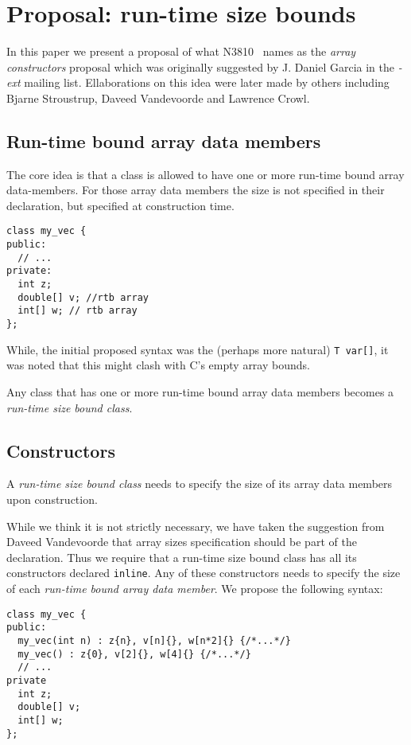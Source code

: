 \section{Proposal: run-time size bounds}

In this paper we present a proposal of what N3810~\cite{n3810} names as the
\emph{array constructors} proposal which was originally suggested by J. Daniel
Garcia in the \emph{-ext} mailing list. Ellaborations on this idea were later
made by others including Bjarne Stroustrup, Daveed Vandevoorde and Lawrence
Crowl.

\subsection{Run-time bound array data members}

The core idea is that a class is allowed to have one or more run-time
bound array data-members. For those array data members the size is not specified in their
declaration, but specified at construction time.

\begin{lstlisting}
class my_vec {
public:
  // ...
private:
  int z;
  double[] v; //rtb array
  int[] w; // rtb array
};
\end{lstlisting}

While, the initial proposed syntax was the (perhaps more natural) 
\verb+T var[]+, it was noted that this might clash with C's empty array bounds.

Any class that has one or more run-time bound array data members becomes a
\emph{run-time size bound class}.

\subsection{Constructors}

A \emph{run-time size bound class} needs to specify the size of its array data
members upon construction.

While we think it is not strictly necessary, we have taken the suggestion from
Daveed Vandevoorde that array sizes specification should be part of the
declaration. Thus we require that a run-time size bound class has all its
constructors declared \verb+inline+. Any of these constructors needs  to specify
the size of each \emph{run-time bound array data member}. We propose the
following syntax:

\begin{lstlisting}
class my_vec {
public:
  my_vec(int n) : z{n}, v[n]{}, w[n*2]{} {/*...*/}
  my_vec() : z{0}, v[2]{}, w[4]{} {/*...*/}
  // ...
private
  int z;
  double[] v;
  int[] w;
};
\end{lstlisting}

